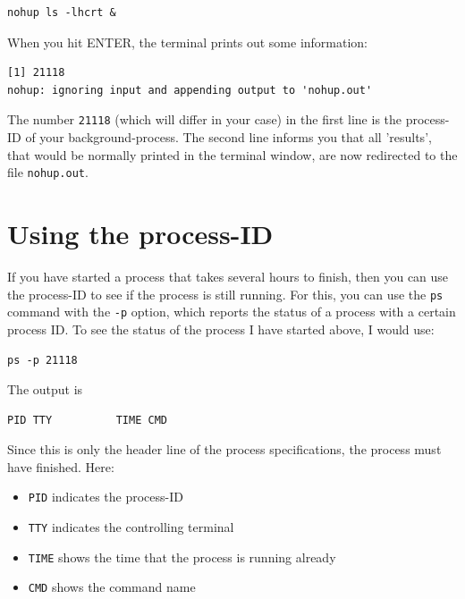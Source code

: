 \documentclass[11pt]{article}
\begin{document}
\begin{verbatim}
nohup ls -lhcrt &
\end{verbatim}

When you hit ENTER, the terminal prints out some information:

\begin{verbatim}
[1] 21118
nohup: ignoring input and appending output to 'nohup.out'
\end{verbatim}

The number \texttt{21118} (which will differ in your case) in the first line
is the process-ID of your background-process. The second line informs you that
all 'results', that would be normally printed in the terminal window,
are now redirected to the file \texttt{nohup.out}. 

\section{Using the process-ID}
\label{sec-6}
If you have started a process that takes several hours
to finish, then you can use the process-ID to see if the process is
still running. For this, you can use the \texttt{ps} command with the \texttt{-p}
option, which reports the status of a process with a certain process
ID. To see the status of the process I have started above, I would
use:

\begin{verbatim}
ps -p 21118
\end{verbatim}

The output is

\begin{verbatim}
PID TTY          TIME CMD
\end{verbatim}

Since this is only the header line of the process specifications, the
process must have finished. 
Here:
\begin{itemize}
\item \texttt{PID} indicates the process-ID
\item \texttt{TTY} indicates the controlling terminal
\item \texttt{TIME} shows the time that the process is running already
\item \texttt{CMD} shows the command name
\end{itemize}
\end{document}
